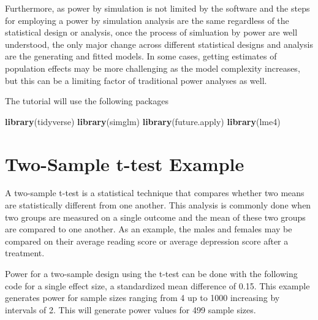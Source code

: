 \documentclass[man,mask,floatsintext]{apa6}
\newenvironment{Shaded}{\begin{snugshade}}{\end{snugshade}}
\newcommand{\ControlFlowTok}[1]{\textcolor[rgb]{0.13,0.29,0.53}{\textbf{#1}}}
\newcommand{\DataTypeTok}[1]{\textcolor[rgb]{0.13,0.29,0.53}{#1}}
\newcommand{\DecValTok}[1]{\textcolor[rgb]{0.00,0.00,0.81}{#1}}
\newcommand{\FloatTok}[1]{\textcolor[rgb]{0.00,0.00,0.81}{#1}}
\newcommand{\KeywordTok}[1]{\textcolor[rgb]{0.13,0.29,0.53}{\textbf{#1}}}
\newcommand{\NormalTok}[1]{#1}
\newcommand{\OperatorTok}[1]{\textcolor[rgb]{0.81,0.36,0.00}{\textbf{#1}}}
\newcommand{\StringTok}[1]{\textcolor[rgb]{0.31,0.60,0.02}{#1}}
\begin{document}
Furthermore, as power by simulation is not limited by the software and the steps for employing a power by simulation analysis are the same regardless of the statistical design or analysis, once the process of simluation by power are well understood, the only major change across different statistical designs and analysis are the generating and fitted models. In some cases, getting estimates of population effects may be more challenging as the model complexity increases, but this can be a limiting factor of traditional power analyses as well.

The tutorial will use the following packages

\begin{Shaded}
\begin{Highlighting}[]
\KeywordTok{library}\NormalTok{(tidyverse)}
\KeywordTok{library}\NormalTok{(simglm)}
\KeywordTok{library}\NormalTok{(future.apply)}
\KeywordTok{library}\NormalTok{(lme4)}
\end{Highlighting}
\end{Shaded}

\hypertarget{two-sample-t-test-example}{%
\section{Two-Sample t-test Example}\label{two-sample-t-test-example}}

A two-sample t-test is a statistical technique that compares whether two means are statistically different from one another. This analysis is commonly done when two groups are measured on a single outcome and the mean of these two groups are compared to one another. As an example, the males and females may be compared on their average reading score or average depression score after a treatment.

Power for a two-sample design using the t-test can be done with the following code for a single effect size, a standardized mean difference of 0.15. This example generates power for sample sizes ranging from 4 up to 1000 increasing by intervals of 2. This will generate power values for 499 sample sizes.

\begin{Shaded}
\end{Shaded}
\end{document}
